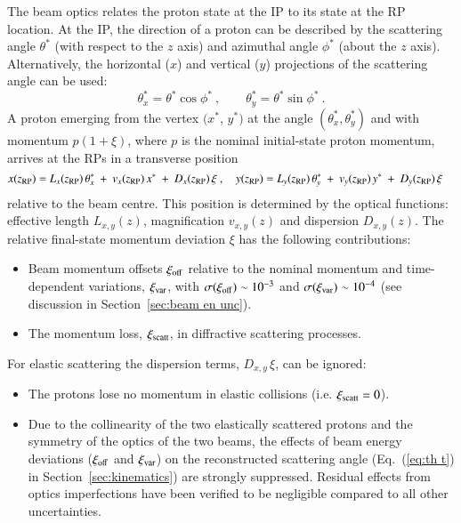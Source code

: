 The beam optics relates the proton state at the IP to its state at the RP location. At the IP, the direction of a proton can be described by the scattering angle $\theta^*$ (with respect to the $z$ axis) and azimuthal angle $\phi^*$ (about the $z$ axis). Alternatively, the horizontal ($x$) and vertical ($y$) projections of the scattering angle can be used:
\begin{equation}
\label{eq:scatt angle}
\theta_x^* = \theta^* \cos\phi^*\ ,\qquad \theta_y^* = \theta^* \sin\phi^*\ .
\end{equation}
A proton emerging from the vertex $(x^*$, $y^*)$ at the angle $(\theta_x^*,\theta_y^*)$ and with momentum  $p (1 +  \xi)$, where $p$ is the nominal initial-state proton momentum, arrives at the RPs in a transverse position
\begin{equation}
\label{eq:prot trans}
	x(z_{\rm RP}) = L_x(z_{\rm RP})\, \theta_x^*\ +\ v_x(z_{\rm RP})\, x^*\ +\ D_x(z_{\rm RP})\, \xi\ ,\quad y(z_{\rm RP}) = L_y(z_{\rm RP})\, \theta_y^*\ +\ v_y(z_{\rm RP})\, y^*\ +\ D_y(z_{\rm RP})\, \xi \quad
\end{equation}
relative to the beam centre. This position is determined by the optical functions: effective length $L_{x,y}(z)$, magnification $v_{x,y}(z)$ and dispersion $D_{x,y}(z)$. 
The relative final-state momentum deviation $\xi$ has the following 
contributions:
\begin{itemize}
\item Beam momentum offsets $\xi_{\rm off}$ relative to the nominal momentum 
and time-dependent variations, $\xi_{\rm var}$, with 
$\sigma(\xi_{\rm off}) \sim 10^{-3}$ and $\sigma(\xi_{\rm var}) \sim 10^{-4}$ 
(see discussion in Section~\ref{sec:beam en unc}).
\item The momentum loss, $\xi_{\rm scatt}$, in diffractive scattering processes.
\end{itemize}
For elastic scattering the dispersion terms, $D_{x,y}\, \xi$, can be ignored: 
\begin{itemize}
\item The protons lose no momentum in elastic collisions 
(i.e. $\xi_{\rm scatt} = 0$).
\item Due to the collinearity of the two elastically scattered protons and 
the symmetry of the optics of the two beams, the effects of 
beam energy deviations ($\xi_{\rm off}$ and $\xi_{\rm var}$) on the 
reconstructed scattering angle (Eq.~(\ref{eq:th t}) in 
Section~\ref{sec:kinematics}) are strongly suppressed. Residual effects from 
optics imperfections have been verified to be negligible compared to all other 
uncertainties.
\end{itemize}


